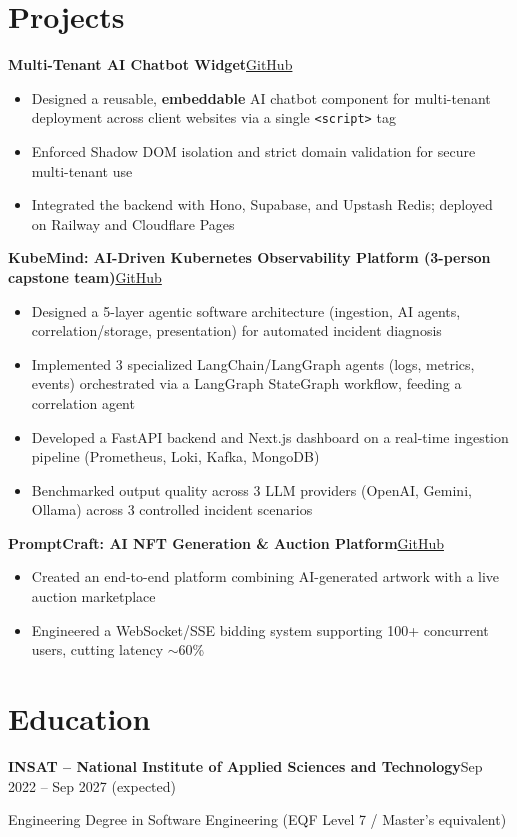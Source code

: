 \documentclass[10pt,a4paper]{article}
\newcommand{\entry}[2]{\vspace{1pt}\noindent\textbf{#1}\hfill{\color{muted}#2}\par}
\newcommand{\gh}[1]{\href{https://github.com/Hsan003/#1}{GitHub}}
\begin{document}
\section{Projects}
\entry{Multi-Tenant AI Chatbot Widget}{\gh{AI-Assistant-Backend}}
\begin{itemize}
  \item Designed a reusable, \textbf{embeddable} AI chatbot component for multi-tenant deployment across client websites via a single \texttt{<script>} tag
  \item Enforced Shadow DOM isolation and strict domain validation for secure multi-tenant use
  \item Integrated the backend with Hono, Supabase, and Upstash Redis; deployed on Railway and Cloudflare Pages
\end{itemize}
\entry{KubeMind: AI-Driven Kubernetes Observability Platform (3-person capstone team)}{\gh{kubemind}}
\begin{itemize}
  \item Designed a 5-layer agentic software architecture (ingestion, AI agents, correlation/storage, presentation) for automated incident diagnosis
  \item Implemented 3 specialized LangChain/LangGraph agents (logs, metrics, events) orchestrated via a LangGraph StateGraph workflow, feeding a correlation agent
  \item Developed a FastAPI backend and Next.js dashboard on a real-time ingestion pipeline (Prometheus, Loki, Kafka, MongoDB)
  \item Benchmarked output quality across 3 LLM providers (OpenAI, Gemini, Ollama) across 3 controlled incident scenarios
\end{itemize}
\entry{PromptCraft: AI NFT Generation \& Auction Platform}{\gh{prompt-craft-back}}
\begin{itemize}
  \item Created an end-to-end platform combining AI-generated artwork with a live auction marketplace
  \item Engineered a WebSocket/SSE bidding system supporting 100+ concurrent users, cutting latency $\sim$60\%
\end{itemize}

\section{Education}
\entry{INSAT -- National Institute of Applied Sciences and Technology}{Sep 2022 -- Sep 2027 (expected)}
Engineering Degree in Software Engineering (EQF Level 7 / Master's equivalent)
\end{document}
